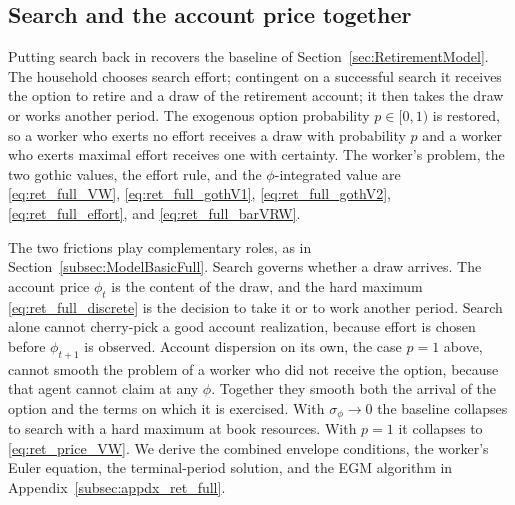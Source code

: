 \subsection{Search and the account price together}\label{subsec:RetirementSearchPrices}
Putting search back in recovers the baseline of Section~\ref{sec:RetirementModel}. The household chooses search effort; contingent on a successful search it receives the option to retire and a draw of the retirement account; it then takes the draw or works another period. The exogenous option probability $p\in[0,1)$ is restored, so a worker who exerts no effort receives a draw with probability $p$ and a worker who exerts maximal effort receives one with certainty. The worker's problem, the two gothic values, the effort rule, and the $\phi$-integrated value are \eqref{eq:ret_full_VW}, \eqref{eq:ret_full_gothV1}, \eqref{eq:ret_full_gothV2}, \eqref{eq:ret_full_effort}, and \eqref{eq:ret_full_barVRW}.

The two frictions play complementary roles, as in Section~\ref{subsec:ModelBasicFull}. Search governs whether a draw arrives. The account price $\phi_t$ is the content of the draw, and the hard maximum \eqref{eq:ret_full_discrete} is the decision to take it or to work another period. Search alone cannot cherry-pick a good account realization, because effort is chosen before $\phi_{t+1}$ is observed. Account dispersion on its own, the case $p=1$ above, cannot smooth the problem of a worker who did not receive the option, because that agent cannot claim at any $\phi$. Together they smooth both the arrival of the option and the terms on which it is exercised. With $\sigma_\phi\to 0$ the baseline collapses to search with a hard maximum at book resources. With $p=1$ it collapses to \eqref{eq:ret_price_VW}. We derive the combined envelope conditions, the worker's Euler equation, the terminal-period solution, and the EGM algorithm in Appendix~\ref{subsec:appdx_ret_full}.

